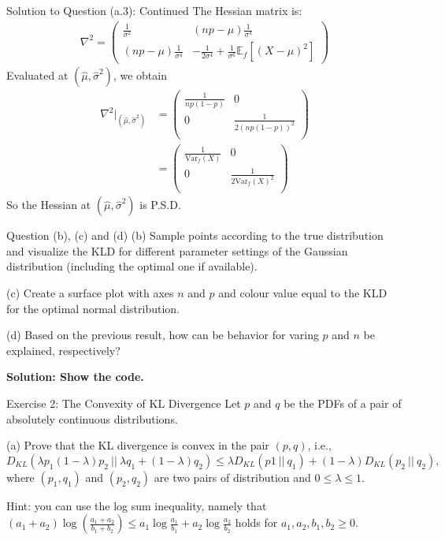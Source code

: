 \documentclass[aspectratio=169]{beamer}
\newcommand{\kld}[1]{D_{KL}\left(#1\right)}
\newcommand{\Ef}{\mathbb{E}_f}
\newcommand{\Varf}{\mathrm{Var}_f}
\begin{document}
\begin{frame}{Solution to Question (a.3): Continued}
	The Hessian matrix is:
	\begin{align*}
		\nabla^2 = \begin{pmatrix}
			\frac{1}{\sigma^2} & (np -\mu) \frac{1}{\sigma^4} \\
			(np -\mu) \frac{1}{\sigma^4} & - \frac{1}{2\sigma^4} + \frac{1}{\sigma^6} \Ef [(X -\mu)^2]
		\end{pmatrix}
	\end{align*}
	Evaluated at $(\hat{\mu}, \hat{\sigma}^2)$, we obtain
	\begin{align*}
		\nabla^2 \bigg|_{(\hat{\mu}, \hat{\sigma}^2)} 
		&= \begin{pmatrix}
			\frac{1}{np(1-p)} & 0 \\
			0 & \frac{1}{2 (np(1-p))^2} \\
			\end{pmatrix} \\
		&= \begin{pmatrix}
			\frac{1}{\Varf(X)} & 0 \\
			0 & \frac{1}{2 \Varf(X)^2} \\
		\end{pmatrix}
	\end{align*}
	So the Hessian at $(\hat{\mu}, \hat{\sigma}^2)$ is P.S.D.
\end{frame}

\begin{frame}{Question (b), (c) and (d)}
	(b) Sample points according to the true distribution and visualize the KLD for different parameter settings of the Gaussian distribution (including the optimal one if available).
	
	\vspace{20pt}
	(c) Create a surface plot with axes $n$ and $p$ and colour value equal to the KLD for the optimal normal distribution.
	
	\vspace{20pt}
	(d) Based on the previous result, how can be behavior for varing $p$ and $n$ be explained, respectively?
	
	\vspace{20pt}
	\textbf{Solution: Show the code.}
\end{frame}


\begin{frame}{Exercise 2: The Convexity of KL Divergence}
	Let $p$ and $q$ be the PDFs of a pair of absolutely continuous distributions. 
	
	(a) Prove that the KL divergence is convex in the pair $(p, q)$, i.e., 
	$$\kld{\lambda p_1 (1 - \lambda) p_2 \ || \ \lambda q_1 + (1-\lambda) q_2} \leq \lambda \kld{p1 \ || \ q_1} + (1 - \lambda) \kld{p_2 \ || \ q_2},$$
	where $(p_1, q_1)$ and $(p_2, q_2)$ are two pairs of distribution and $0 \leq \lambda \leq 1$.
	
	\vspace{20pt}
	Hint: you can use the log sum inequality, namely that $(a_1 + a_2) \log \left( \frac{a_1 + a_2}{b_1 + b_2} \right) \leq a_1 \log \frac{a_1}{b_1} + a_2 \log \frac{a_2}{b_2}$ holds for $a_1, a_2, b_1, b_2 \geq 0$.
\end{frame}
\end{document}
